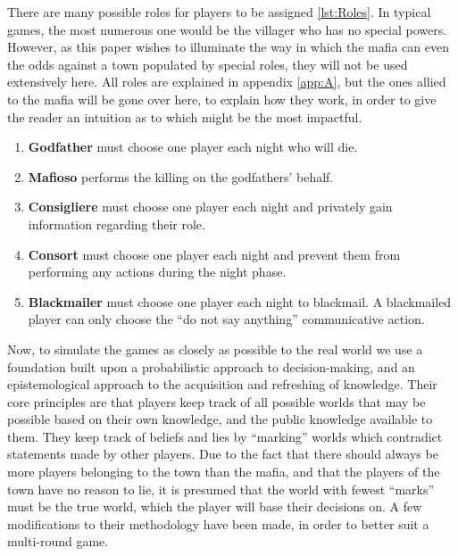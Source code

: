 There are many possible roles for players to be assigned \ref{lst:Roles}. In
typical games, the most numerous one would be the villager who has no special
powers. However, as this paper wishes to illuminate the way in which the mafia
can even the odds against a town populated by special roles, they will not be
used extensively here. All roles are explained in appendix \ref{app:A}, but the
ones allied to the mafia will be gone over here, to explain how they work, in
order to give the reader an intuition as to which might be the most impactful.

\begin{enumerate}
	\itemsep0px
	\item\textbf{Godfather} must choose one player each night who will die.
	\item\textbf{Mafioso} performs the killing on the godfathers' behalf.
	\item\textbf{Consigliere} must choose one player each night and privately
	      gain information regarding their role.
	\item\textbf{Consort} must choose one player each night and prevent them
	      from performing any actions during the night phase.
	\item\textbf{Blackmailer} must choose one player each night to blackmail. A
	      blackmailed player can only choose the “do not say anything” communicative
	      action.
	      \label{lst:Roles}
\end{enumerate}

Now, to simulate the games as closely as possible to the real world we use a
foundation built upon a probabilistic approach to decision-making, and an
epistemological approach to the acquisition and refreshing of
knowledge\cite{commitment}. Their core principles are that players keep track
of all possible worlds that may be possible based on their own knowledge, and
the public knowledge available to them. They keep track of beliefs and lies by
“marking” worlds which contradict statements made by other players. Due to the
fact that there should always be more players belonging to the town than the
mafia, and that the players of the town have no reason to lie, it is presumed
that the world with fewest “marks” must be the true world, which the player
will base their decisions on. A few modifications to their methodology have
been made, in order to better suit a multi-round game.

